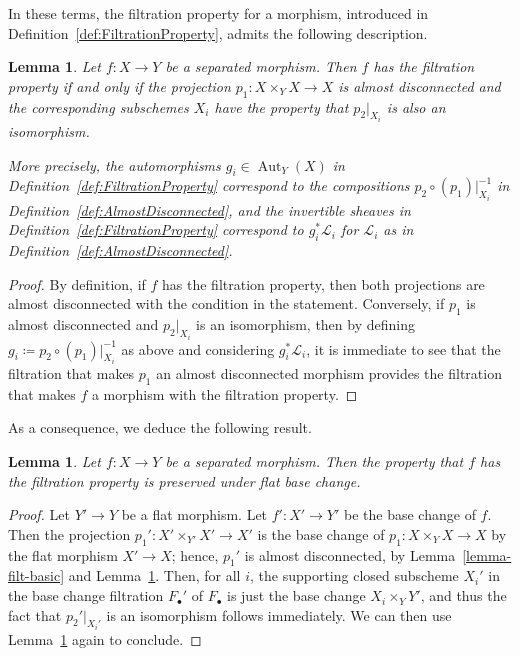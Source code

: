 \documentclass[11pt, reqno]{amsart}
\numberwithin{equation}{section}
\theoremstyle{plain}
\newtheorem{lemma}[theorem]{Lemma}
\theoremstyle{remark}
\theoremstyle{definition}
\theoremstyle{italicsname}
\DeclareMathOperator{\Aut}{Aut}
\newcommand{\cL}{\mathcal{L}}
\begin{document}
In these terms, the filtration property for a morphism, introduced in Definition~\ref{def:FiltrationProperty}, admits the following description. 
\begin{lemma}\label{lem:FiltrationVSAlmost} 
Let $f\colon X\to Y$ be a separated morphism.    
Then $f$ has the filtration property if and only if the projection $p_1\colon X\times_Y X\to X$ is almost disconnected and the corresponding subschemes $X_i$ have the property that $p_2|_{X_i}$ is also an isomorphism. 

More precisely, the automorphisms $g_i\in\Aut_Y(X)$ in Definition~\ref{def:FiltrationProperty} correspond to the compositions $p_2\circ(p_1)|_{X_i}^{-1}$ in Definition~\ref{def:AlmostDisconnected}, and the invertible sheaves in Definition~\ref{def:FiltrationProperty} correspond to $g_i^*\cL_i$ for $\cL_i$ as in Definition~\ref{def:AlmostDisconnected}. 
\end{lemma}

\begin{proof}
By definition, if $f$ has the filtration property, then both projections are almost disconnected with the condition in the statement.
Conversely, if $p_1$ is almost disconnected and $p_2|_{X_i}$ is an isomorphism, then by defining $g_i\coloneqq p_2\circ(p_1)|_{X_i}^{-1}$ as above and considering $g_i^*\cL_i$, it is immediate to see that the filtration that makes $p_1$ an almost disconnected morphism provides the filtration that makes $f$ a morphism with the filtration property.
\end{proof}

As a consequence, we deduce the following result.

\begin{lemma}\label{lem:FiltrationBaseChange}
Let $f \colon X \to Y$ be a separated morphism. 
Then the property that $f$ has the filtration property is preserved under flat base change. 
\end{lemma}

\begin{proof}
Let $Y'\to Y$ be a flat morphism. 
Let $f'\colon X'\to Y'$ be the base change of $f$.
Then the projection $p_1'\colon X'\times_{Y'}X'\to X'$ is the base change of $p_1\colon X\times_Y X\to X$ by the flat morphism $X'\to X$; hence, $p_1'$ is almost disconnected, by Lemma~\ref{lemma-filt-basic} and Lemma~\ref{lem:FiltrationVSAlmost}.
Then, for all $i$, the supporting closed subscheme $X_i'$ in the base change filtration $F_\bullet'$ of $F_\bullet$ is just the base change $X_i\times_Y Y'$, and thus the fact that $p_2'|_{X_i'}$ is an isomorphism follows immediately.
We can then use Lemma~\ref{lem:FiltrationVSAlmost} again to conclude.
\end{proof}
\end{document}
